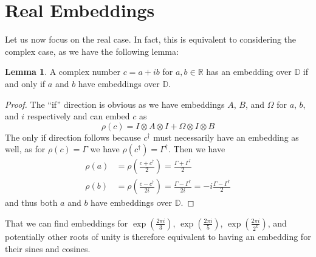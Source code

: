 \documentclass{article}
\theoremstyle{definition}
\theoremstyle{theorem}
\newtheorem{lemma}{Lemma}
\theoremstyle{remark}
\begin{document}
	\section{Real Embeddings}
	
	Let us now focus on the real case. In fact, this is equivalent to considering the complex case, as we have the following lemma:
	\begin{lemma}
		A complex number $c=a+i b$ for $a,b\in\mathbb{R}$ has an embedding over $\mathbb{D}$ if and only if $a$ and $b$ have embeddings over $\mathbb{D}$.
	\end{lemma}
	\begin{proof}
		The ``if'' direction is obvious as we have embeddings $A$, $B$, and $\Omega$ for $a$, $b$, and $i$ respectively and can embed $c$ as
		\[
		    \rho(c) = I\otimes A \otimes I + \Omega\otimes I \otimes B
		\]
		The only if direction follows because $c^\dagger$ must necessarily have an embedding as well, as for $\rho(c)=\Gamma$ we have $\rho(c^\dagger)=\Gamma^\dagger$. Then we have
		\begin{align*}
			\rho(a) &= \rho\left(\frac{c+c^\dagger}{2}\right) = \frac{\Gamma + \Gamma^\dagger}{2}\\
			\rho(b) &= \rho\left(\frac{c-c^\dagger}{2 i}\right) = \frac{\Gamma - \Gamma^\dagger}{2 i} = -i\frac{\Gamma-\Gamma^\dagger}{2}
		\end{align*}
		and thus both $a$ and $b$ have embeddings over $\mathbb{D}$.
	\end{proof}
	That we can find embeddings for $\exp\left(\frac{2\pi i}{3}\right)$, $\exp\left(\frac{2\pi i}{5}\right)$, $\exp\left(\frac{2\pi i}{2^k}\right)$, and potentially other roots of unity is therefore equivalent to having an embedding for their sines and cosines.
	
\end{document}
